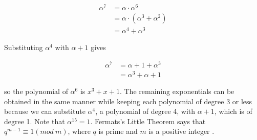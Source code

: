 \documentclass[../main.tex]{subfiles}
\begin{document}
    \begin{align*}
        \alpha^7 &= \alpha \cdot \alpha^6 \\
                 &= \alpha \cdot (\alpha^3 + \alpha^2) \\
                 &= \alpha^4 + \alpha^3
    \end{align*}

    \noindent
    Substituting ${\alpha^4}$ with ${\alpha + 1}$ gives

    \begin{align*}
        \alpha^7 &= \alpha + 1 + \alpha^3 \\
                 &= \alpha^3 + \alpha + 1
    \end{align*}

     \noindent
    so the polynomial of ${\alpha^6}$ is ${x^3 + x + 1}$. The remaining exponentials can be obtained in the same manner while keeping each polynomial of degree 3 or less because we can substitute ${\alpha^4}$, a polynomial of degree 4, with ${\alpha + 1}$, which is of degree 1. Note that ${\alpha^{15} = 1}$. Fermats's Little Theorem says that ${q^{m - 1} \equiv 1 (mod\ m)}$, where ${q}$ is prime and ${m}$ is a positive integer \autocite{blahut1983theory} \autocite{bossert1999channel}.
\end{document}

